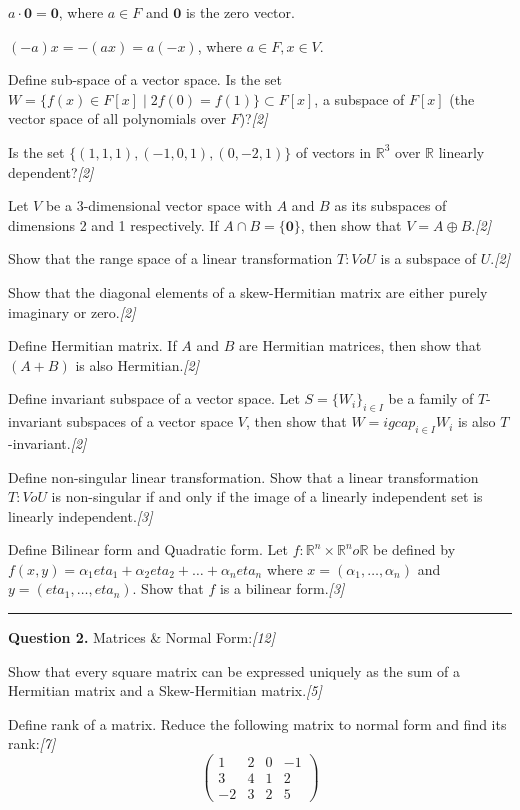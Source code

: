 \documentclass[11pt,a4paper]{article}
\newcommand{\pts}[1]{\hfill   \textit{[#1]}}
\begin{document}
{\begin{parts}
\begin{parts}
    \item $a \cdot \mathbf{0} = \mathbf{0}$, where $a \in F$ and $\mathbf{0}$ is the zero vector.
    \item $(-a)x = -(ax) = a(-x)$, where $a \in F, x \in V$.
  \end{parts}
  \item Define sub-space of a vector space. Is the set $W = \{f(x) \in F[x] \mid 2f(0) = f(1)\} \subset F[x]$, a subspace of $F[x]$ (the vector space of all polynomials over $F$)?\pts{2}
  \item Is the set $\{(1, 1, 1), (-1, 0, 1), (0, -2, 1)\}$ of vectors in $\mathbb{R}^3$ over $\mathbb{R}$ linearly dependent?\pts{2}
  \item Let $V$ be a 3-dimensional vector space with $A$ and $B$ as its subspaces of dimensions 2 and 1 respectively. If $A \cap B = \{\mathbf{0}\}$, then show that $V = A \oplus B$.\pts{2}
  \item Show that the range space of a linear transformation $T: V  o U$ is a subspace of $U$.\pts{2}
  \item Show that the diagonal elements of a skew-Hermitian matrix are either purely imaginary or zero.\pts{2}
  \item Define Hermitian matrix. If $A$ and $B$ are Hermitian matrices, then show that $(A + B)$ is also Hermitian.\pts{2}
  \item Define invariant subspace of a vector space. Let $S = \{W_i\}_{i \in I}$ be a family of $T$-invariant subspaces of a vector space $V$, then show that $W = igcap_{i \in I} W_i$ is also $T$-invariant.\pts{2}
  \item Define non-singular linear transformation. Show that a linear transformation $T: V  o U$ is non-singular if and only if the image of a linearly independent set is linearly independent.\pts{3}
  \item Define Bilinear form and Quadratic form. Let $f: \mathbb{R}^n  \times \mathbb{R}^n  o \mathbb{R}$ be defined by $f(x,y) = \alpha_1 eta_1 + \alpha_2 eta_2 + \dots + \alpha_n eta_n$ where $x = (\alpha_1, \dots, \alpha_n)$ and $y = (eta_1, \dots, eta_n)$. Show that $f$ is a bilinear form.\pts{3}
\end{parts}

\medskip\rule{\linewidth}{0.2pt}




\noindent   \textbf{Question 2.} Matrices \& Normal Form:\pts{12}

\begin{parts}
  \item Show that every square matrix can be expressed uniquely as the sum of a Hermitian matrix and a Skew-Hermitian matrix.\pts{5}
  \item Define rank of a matrix. Reduce the following matrix to normal form and find its rank:\pts{7}
  $$
\begin{pmatrix} 1 & 2 & 0 & -1 \\ 3 & 4 & 1 & 2 \\ -2 & 3 & 2 & 5 \end{pmatrix}$$
\end{parts}

}
\end{document}
